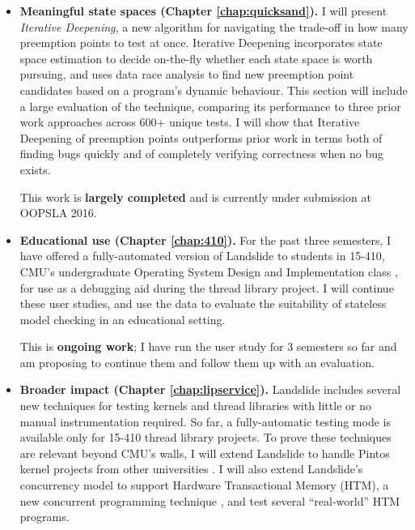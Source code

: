 \documentclass[12pt]{cmuthesis}
\begin{document}
\begin{itemize}
	\item {\bf Meaningful state spaces (Chapter \ref{chap:quicksand}).}
		I will present {\em Iterative Deepening}, a new algorithm for navigating the trade-off in how many preemption points to test at once.
		Iterative Deepening incorporates state space estimation \cite{estimation} to decide on-the-fly whether each state space is worth pursuing, and uses data race analysis \cite{tsan} to find new preemption point candidates based on a program's dynamic behaviour.
		This section will include a large evaluation of the technique, comparing its performance to three prior work approaches across 600+ unique tests.
		I will show that Iterative Deepening of preemption points outperforms prior work in terms both of finding bugs quickly and of completely verifying correctness when no bug exists.

		This work is {\bf largely completed} and is currently under submission at OOPSLA 2016.
	\item {\bf Educational use (Chapter \ref{chap:410}).}
		For the past three semesters, I have offered a fully-automated version of Landslide to students in 15-410, CMU's undergraduate Operating System Design and Implementation class \cite{kspec,thrlib}, for use as a debugging aid during the thread library project.
		I will continue these user studies, and use the data to evaluate the suitability of stateless model checking in an educational setting.

		This is {\bf ongoing work}; I have run the user study for 3 semesters so far and am proposing to continue them and follow them up with an evaluation.
	\item {\bf Broader impact (Chapter \ref{chap:lipservice}).}
		Landslide includes several new techniques for testing kernels and thread libraries with little or no manual instrumentation required.
		So far, a fully-automatic testing mode is available only for 15-410 thread library projects.
		To prove these techniques are relevant beyond CMU's walls, I will extend Landslide to handle Pintos kernel projects from other universities \cite{pintos}. %
		I will also extend Landslide's concurrency model to support Hardware Transactional Memory (HTM), a new concurrent programming technique \cite{transactional-memory}, and test several ``real-world'' HTM programs.


\end{itemize}
\end{document}
